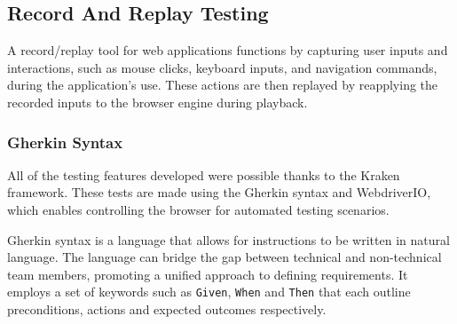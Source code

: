 \subsection{Record And Replay Testing}

A record/replay tool for web applications functions by capturing user inputs and interactions, such as mouse clicks, keyboard inputs, and navigation commands, during the application's use. These actions are then replayed by reapplying the recorded inputs to the browser engine during playback. \citep{inproc:recordreplay-2016}

\subsubsection{Gherkin Syntax}

All of the testing features developed were possible thanks to the Kraken framework. These tests are made using the Gherkin syntax and WebdriverIO, which enables controlling the browser for automated testing scenarios. \citep{art:kraken-2023}

Gherkin syntax is a language that allows for instructions to be written in natural language. The language can bridge the gap between technical and non-technical team members, promoting a unified approach to defining requirements. It employs a set of keywords such as \verb|Given|, \verb|When| and \verb|Then| that each outline preconditions, actions and expected outcomes respectively. \cite{misc:cucumber-gherkin-2023}


